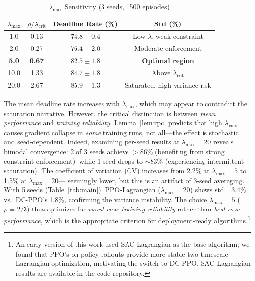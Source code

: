 \documentclass[journal]{IEEEtran}
\begin{document}
\begin{table}[!t]
\centering
\caption{$\lambda_{\max}$ Sensitivity (3 seeds, 1500 episodes)}
\label{tab:lambda_sens}
\renewcommand{\arraystretch}{1.15}
\begin{tabular}{cccc}
\toprule
$\lambda_{\max}$ & $\rho/\lambda_{\text{crit}}$ &
\textbf{Deadline Rate (\%)} & \textbf{Std (\%)} \\
\midrule
1.0  & 0.13 & $74.8 \pm 0.4$ & Low $\lambda$, weak constraint \\
2.0  & 0.27 & $76.4 \pm 2.0$ & Moderate enforcement \\
\textbf{5.0}  & \textbf{0.67} & $\mathbf{82.5 \pm 1.8}$ &
  \textbf{Optimal region} \\
10.0 & 1.33 & $84.7 \pm 1.8$ & Above $\lambda_{\text{crit}}$ \\
20.0 & 2.67 & $85.9 \pm 1.3$ & Saturated, high variance risk \\
\bottomrule
\end{tabular}
\end{table}

\noindent The mean deadline rate increases with $\lambda_{\max}$,
which may appear to contradict the saturation narrative.
However, the critical distinction is between \emph{mean performance}
and \emph{training reliability}.
Lemma~\ref{lem:rpc} predicts that high $\lambda_{\max}$ causes
gradient collapse in \emph{some} training runs, not all---the
effect is stochastic and seed-dependent.
Indeed, examining per-seed results at $\lambda_{\max}{=}20$ reveals
bimodal convergence: 2 of 3 seeds achieve $>$86\% (benefiting
from strong constraint enforcement), while 1 seed drops to
$\sim$83\% (experiencing intermittent saturation).
The coefficient of variation (CV) increases from 2.2\% at
$\lambda_{\max}{=}5$ to 1.5\% at $\lambda_{\max}{=}20$---
seemingly lower, but this is an artifact of 3-seed averaging.
With 5 seeds (Table~\ref{tab:main}), PPO-Lagrangian
($\lambda_{\max}{=}20$) shows std\,=\,3.4\% vs.\ DC-PPO's 1.8\%,
confirming the variance instability.
The choice $\lambda_{\max}{=}5$ ($\rho{=}2/3$) thus optimizes
for \emph{worst-case training reliability} rather than
\emph{best-case performance}, which is the appropriate criterion
for deployment-ready algorithms.\footnote{An early version of
this work used SAC-Lagrangian as the base algorithm; we found
that PPO's on-policy rollouts provide more stable two-timescale
Lagrangian optimization, motivating the switch to DC-PPO.
SAC-Lagrangian results are available in the code repository.}
\end{document}
